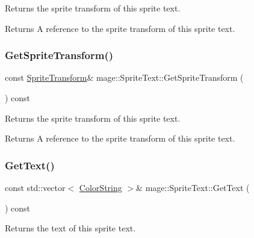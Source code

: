 Returns the sprite transform of this sprite text.

\begin{DoxyReturn}{Returns}
A reference to the sprite transform of this sprite text. 
\end{DoxyReturn}
\hypertarget{classmage_1_1_sprite_text_aa1b83ca76e72decf0b476d07a9a35c83}{}\label{classmage_1_1_sprite_text_aa1b83ca76e72decf0b476d07a9a35c83} 
\subsubsection{\texorpdfstring{Get\+Sprite\+Transform()}{GetSpriteTransform()}\hspace{0.1cm}{\footnotesize\ttfamily [2/2]}}
{\footnotesize\ttfamily const \hyperlink{classmage_1_1_sprite_transform}{Sprite\+Transform}\& mage\+::\+Sprite\+Text\+::\+Get\+Sprite\+Transform (\begin{DoxyParamCaption}{ }\end{DoxyParamCaption}) const\hspace{0.3cm}{\ttfamily [noexcept]}}

Returns the sprite transform of this sprite text.

\begin{DoxyReturn}{Returns}
A reference to the sprite transform of this sprite text. 
\end{DoxyReturn}
\hypertarget{classmage_1_1_sprite_text_a035a18c8c388649f38a6a62e3cbcc18a}{}\label{classmage_1_1_sprite_text_a035a18c8c388649f38a6a62e3cbcc18a} 
\subsubsection{\texorpdfstring{Get\+Text()}{GetText()}}
{\footnotesize\ttfamily const std\+::vector$<$ \hyperlink{classmage_1_1_color_string}{Color\+String} $>$\& mage\+::\+Sprite\+Text\+::\+Get\+Text (\begin{DoxyParamCaption}{ }\end{DoxyParamCaption}) const\hspace{0.3cm}{\ttfamily [noexcept]}}

Returns the text of this sprite text.

